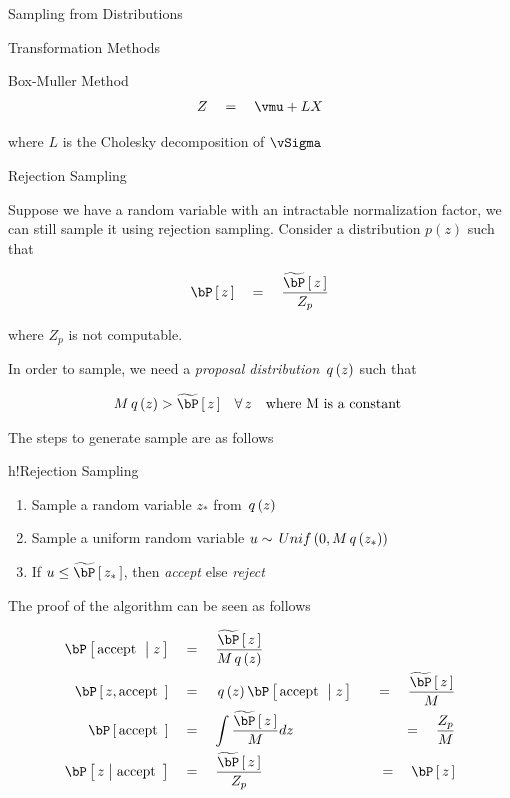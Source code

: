 \documentclass{article}
\begin{document}
\begin{ssection}{Sampling from Distributions}
\begin{ssubsection}{Transformation Methods}
\begin{sssubsection}{Box-Muller Method}
			\begin{align*}
				Z	\eq		\vmu + LX
			\end{align*}

			where $L$ is the Cholesky decomposition of $\vSigma$


		\end{sssubsection}

	\end{ssubsection}

	\begin{ssubsection}{Rejection Sampling}

		Suppose we have a random variable with an intractable normalization factor, we can still sample it using rejection sampling. Consider a distribution $p(z)$ such that

		\begin{align*}
			\prob{z}	\eq \frac{\aprob{z}}{Z_p}
		\end{align*}

		where $Z_p$ is not computable. \br%

		In order to sample, we need a \textit{proposal distribution} $\func{q}{z}$ such that

		\begin{align*}
			M \func{q}{z} > \aprob{z}	&&	\forall\, z \quad \mt{where M is a constant}
		\end{align*}

		The steps to generate sample are as follows

		\begin{algo}{h!}{Rejection Sampling}

			\begin{enumerate}
				\item Sample a random variable $z_\ast$ from $\func{q}{z}$
				\item Sample a uniform random variable $u \sim \func{Unif}{0, M \func{q}{z_\ast}}$
				\item If $u \le \aprob{z_\ast}$, then \textit{accept} else \textit{reject}
			\end{enumerate}

		\end{algo}

		The proof of the algorithm can be seen as follows

		\begin{align*}
			\prob{\mt{accept} \pipe z}	&\eq	\frac{\aprob{z}}{M \func{q}{z}} \\
			\prob{z, \mt{accept}}		&\eq	\func{q}{z} \prob{\mt{accept} \pipe z} 	&\eq \frac{\aprob{z}}{M} \\
			\prob{\mt{accept}}			&\eq	\int \frac{\aprob{z}}{M} dz				&\eq	\frac{Z_p}{M} \\
			\prob{z \pipe \mt{accept}}	&\eq	\frac{\aprob{z}}{Z_p}					&\eq	\prob{z}
		\end{align*}


\end{ssubsection}
\end{ssection}
\end{document}
